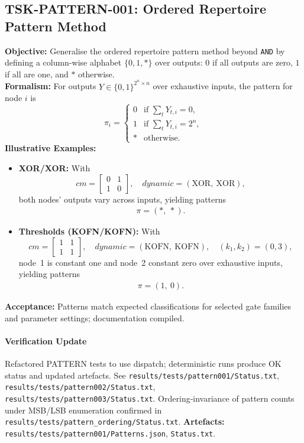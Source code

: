 \documentclass[11pt]{article}
\begin{document}
\subsection{TSK-PATTERN-001: Ordered Repertoire Pattern Method}
\textbf{Objective:} Generalise the ordered repertoire pattern method beyond \texttt{AND} by defining a column-wise alphabet \(\{0,1,*\}\) over outputs: \(0\) if all outputs are zero, \(1\) if all are one, and \(*\) otherwise.\\
\textbf{Formalism:} For outputs \(Y \in \{0,1\}^{2^n \times n}\) over exhaustive inputs, the pattern for node \(i\) is
\[
\pi_i = \begin{cases}
0 & \text{if } \sum_{t} Y_{t,i} = 0,\\
1 & \text{if } \sum_{t} Y_{t,i} = 2^n,\\
* & \text{otherwise.}
\end{cases}
\]
\textbf{Illustrative Examples:}
\begin{itemize}
\item \textbf{XOR/XOR:} With
\[
cm = \begin{bmatrix}0 & 1\\ 1 & 0\end{bmatrix},\quad dynamic=(\text{XOR},\ \text{XOR}),
\]
both nodes’ outputs vary across inputs, yielding patterns
\[
\begin{array}{c}
\pi = (*,\ *).
\end{array}
\]
\item \textbf{Thresholds (KOFN/KOFN):} With
\[
cm = \begin{bmatrix}1 & 1\\ 1 & 1\end{bmatrix},\quad dynamic=(\text{KOFN},\ \text{KOFN}),\quad (k_1, k_2)=(0,3),
\]
node~1 is constant one and node~2 constant zero over exhaustive inputs, yielding patterns
\[
\begin{array}{c}
\pi = (1,\ 0).
\end{array}
\]
\end{itemize}
\textbf{Acceptance:} Patterns match expected classifications for selected gate families and parameter settings; documentation compiled.\\
\paragraph{Verification Update} Refactored PATTERN tests to use dispatch; deterministic runs produce OK status and updated artefacts. See \texttt{results/tests/pattern001/Status.txt}, \texttt{results/tests/pattern002/Status.txt}, \texttt{results/tests/pattern003/Status.txt}. Ordering‑invariance of pattern counts under MSB/LSB enumeration confirmed in \texttt{results/tests/pattern\_ordering/Status.txt}.
\textbf{Artefacts:} \texttt{results/tests/pattern001/Patterns.json}, \texttt{Status.txt}.\
\end{document}
